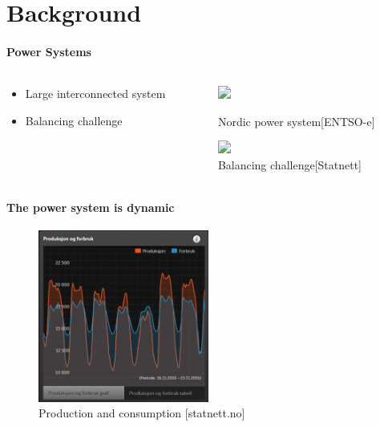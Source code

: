 \section{Background}
\begin{frame}{\secname}
	\framesubtitle{Power Systems}
	\begin{columns}
	\begin{column}{0.5\textwidth}
		\begin{itemize}
			\item<1-> Large interconnected system
			\item<2-> Balancing challenge
		\end{itemize}
	\end{column}
	\begin{column}{0.5\textwidth}	
	\begin{figure}
	\begin{center}
	\includegraphics<1>[width=0.7\textwidth]{./pictures/nordic}
	\caption{Nordic power system[ENTSO-e]}
	\includegraphics<2->[width=0.7\textwidth]{./pictures/balance}
	\caption{Balancing challenge[Statnett]}
	\end{center}
	\end{figure}
	\end{column}
	\end{columns}
\end{frame}
\begin{frame}{\secname}
	\framesubtitle{The power system is dynamic}
	\begin{figure}
		\includegraphics[width=0.5\textwidth]{./pictures/static}
		\caption{Production and consumption [statnett.no]}
	\end{figure}
\end{frame}
